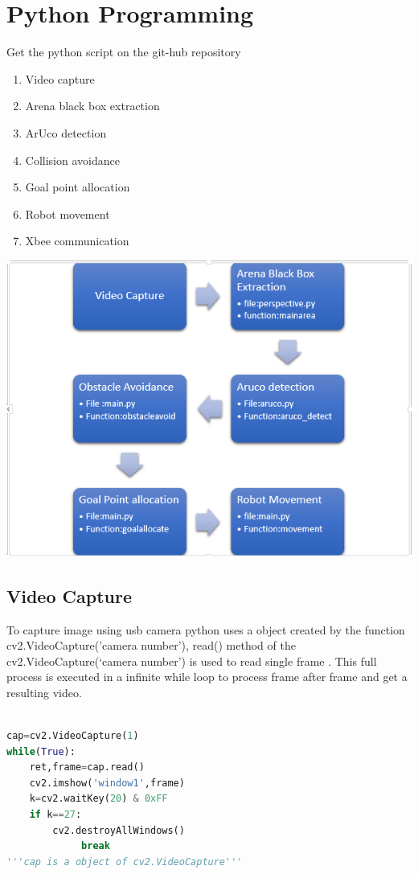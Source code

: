 \documentclass[main.tex]{subfiles}
\begin{document}
\chapter[Python Programming]{Python Programming}

Get the python script on the git-hub repository \href{https://github.com/eYSIP-2017/eYSIP-2017_Formation_Control_of_Multiple_Swarm_Robots}{\ExternalLink}

	\begin{enumerate}
		\item Video capture
		\item Arena black box extraction
		\item ArUco detection
		\item Collision avoidance
		\item Goal point allocation
		\item Robot movement
		\item Xbee communication
	\end{enumerate}	

\includegraphics[scale=.8]{images/flowchart.png}

\section{Video Capture}
To capture image using usb camera python uses a object created by the function cv2.VideoCapture('camera number'),
read() method of the cv2.VideoCapture(`camera number') is used to read single frame .
This full process is executed in a infinite while loop to process frame after frame and get a resulting video.
\begin{lstlisting}[language=Python, caption = Capturing Video]
		
cap=cv2.VideoCapture(1)
while(True):
	ret,frame=cap.read()
	cv2.imshow('window1',frame)
	k=cv2.waitKey(20) & 0xFF
	if k==27:
		cv2.destroyAllWindows()
       		 break	
'''cap is a object of cv2.VideoCapture'''
\end{lstlisting}
\pagebreak
\end{document}
